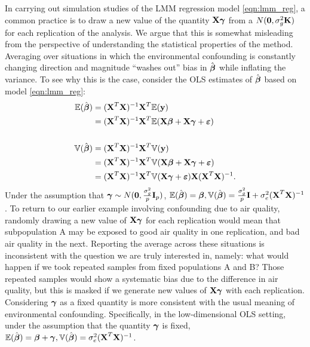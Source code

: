 In carrying out simulation studies of the LMM regression model \eqref{eqn:lmm_reg}, a common practice \citep{Rakitsch2012, bhatnagar2019simultaneous} is to draw a new value of the quantity $\textbf{X}\boldsymbol{\gamma}$ from a $N(\boldsymbol{0}, \sigma^2_g \textbf{K})$ for each replication of the analysis.  We argue that this is somewhat misleading from the perspective of understanding the statistical properties of the method. Averaging over situations in which the environmental confounding is constantly changing direction and magnitude ``washes out'' bias in $\hat{\boldsymbol{\beta}}$ while inflating the variance. To see why this is the case, consider the OLS  estimates of $\hat{\boldsymbol{\beta}}$ based on model \eqref{eqn:lmm_reg}:
\begin{align*}
    \mathbb{E}(\hat{\boldsymbol{\beta}}) &= (\textbf{X}^T \textbf{X})^{-1} \textbf{X}^T \mathbb{E}(\textbf{y})\\
    &=  (\textbf{X}^T \textbf{X})^{-1} \textbf{X}^T \mathbb{E}(\textbf{X}\boldsymbol{\beta} + \textbf{X}\boldsymbol{\gamma} + \boldsymbol{\varepsilon})\\
    &\quad\\
    \mathbb{V}(\hat{\boldsymbol{\beta}}) &= (\textbf{X}^T \textbf{X})^{-1} \textbf{X}^T \mathbb{V}(\textbf{y})\\
    &=  (\textbf{X}^T \textbf{X})^{-1} \textbf{X}^T \mathbb{V}(\textbf{X}\boldsymbol{\beta} + \textbf{X}\boldsymbol{\gamma} + \boldsymbol{\varepsilon})\\
    &=  (\textbf{X}^T \textbf{X})^{-1} \textbf{X}^T \mathbb{V}(\textbf{X}\boldsymbol{\gamma} + \boldsymbol{\varepsilon}) \textbf{X}  (\textbf{X}^T \textbf{X})^{-1}.
\end{align*}
Under the assumption that $\boldsymbol{\gamma} \sim N(\boldsymbol{0}, \frac{\sigma^2_g}{p} \textbf{I}_p)$, $\mathbb{E}(\hat{\boldsymbol{\beta}}) = \boldsymbol{\beta}, \mathbb{V}(\hat{\boldsymbol{\beta}}) = \frac{\sigma^2_g}{p}\textbf{I} + \sigma^2_e (\textbf{X}^T \textbf{X})^{-1}$ . To return to our earlier example involving confounding due to air quality, randomly drawing a new value of $\textbf{X}\boldsymbol{\gamma}$ for each replication would mean that subpopulation A may be exposed to good air quality in one replication, and bad air quality in the next. Reporting the average across these situations is inconsistent with the question we are truly interested in, namely: what would happen if we took repeated samples from fixed populations A and B? Those repeated samples would show a systematic bias due to the difference in air quality, but this is masked if we generate new values of $\textbf{X}\boldsymbol{\gamma}$ with each replication. Considering $\boldsymbol{\gamma}$ as a fixed quantity is more consistent with the usual meaning of environmental confounding. Specifically, in the low-dimensional OLS setting, under the assumption that the quantity $\boldsymbol{\gamma}$ is fixed, $\mathbb{E}(\hat{\boldsymbol{\beta}}) = \boldsymbol{\beta} + \boldsymbol{\gamma}, \mathbb{V}(\hat{\boldsymbol{\beta}}) = \sigma^2_e (\textbf{X}^T \textbf{X})^{-1}$. 

